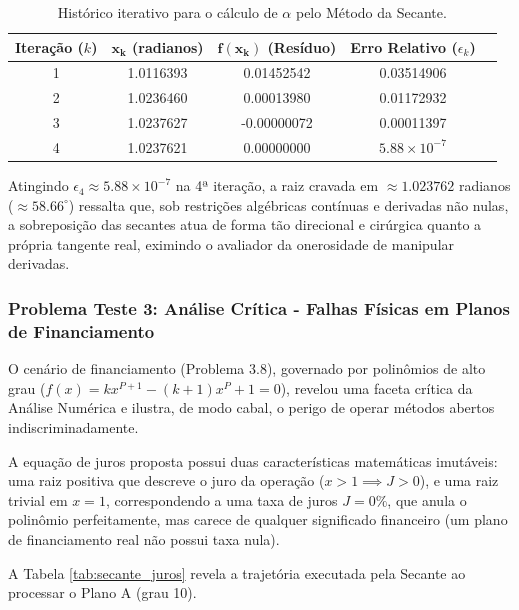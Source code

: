\begin{table}[htpb]
\centering
\caption{Histórico iterativo para o cálculo de $\alpha$ pelo Método da Secante.}
\label{tab:secante_missil}
\small
\begin{tabular}{@{}ccccc@{}}
\toprule
\textbf{Iteração ($k$)} & $\mathbf{x_k}$ (radianos) & $\mathbf{f(x_k)}$ (Resíduo) & \textbf{Erro Relativo} ($\epsilon_k$) \\ \midrule
1 & 1.0116393 & \phantom{-}0.01452542 & 0.03514906 \\
2 & 1.0236460 & \phantom{-}0.00013980 & 0.01172932 \\
3 & 1.0237627 & -0.00000072           & 0.00011397 \\
4 & 1.0237621 & \phantom{-}0.00000000 & $5.88 \times 10^{-7}$ \\ \bottomrule
\end{tabular}
\end{table}

Atingindo $\epsilon_4 \approx 5.88 \times 10^{-7}$ na 4ª iteração, a raiz cravada em $\approx 1.023762$ radianos ($\approx 58.66^\circ$) ressalta que, sob restrições algébricas contínuas e derivadas não nulas, a sobreposição das secantes atua de forma tão direcional e cirúrgica quanto a própria tangente real, eximindo o avaliador da onerosidade de manipular derivadas.

\subsubsection{Problema Teste 3: Análise Crítica - Falhas Físicas em Planos de Financiamento}
\label{subsubsec:problema_teste_3_secante}

O cenário de financiamento (Problema 3.8), governado por polinômios de alto grau ($f(x) = kx^{P+1} - (k+1)x^P + 1 = 0$), revelou uma faceta crítica da Análise Numérica e ilustra, de modo cabal, o perigo de operar métodos abertos indiscriminadamente. 

A equação de juros proposta possui duas características matemáticas imutáveis: uma raiz positiva que descreve o juro da operação ($x > 1 \implies J > 0$), e uma raiz trivial em $x=1$, correspondendo a uma taxa de juros $J = 0\%$, que anula o polinômio perfeitamente, mas carece de qualquer significado financeiro (um plano de financiamento real não possui taxa nula).

A Tabela \ref{tab:secante_juros} revela a trajetória executada pela Secante ao processar o Plano A (grau 10).


